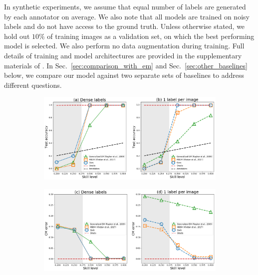 In synthetic experiments, we assume that equal number of labels are generated by each annotator on average. We also note that all models are trained on noisy labels and do not have access to the ground truth. Unless otherwise stated, we hold out $10\%$ of training images as a validation set, on which the best performing model is selected. We also perform no data augmentation during training. Full details of training and model architectures are provided in the supplementary materials of \cite{tanno2019learning}. In Sec.~\ref{sec:comparison_with_em} and Sec.~\ref{sec:other_baselines} below, we compare our model against two separate sets of baselines to address different questions. 

\begin{figure}[ht]
	\center
	\begin{subfigure}[]{0.49\linewidth}
		\includegraphics[width=\linewidth]{chapter_4/figures/figures_new/figure_3_ab.png}
	\end{subfigure}
	\begin{subfigure}[]{0.49\linewidth}
		\includegraphics[width=\linewidth]{chapter_4/figures/figures_new/figure_3_cd.png}
	\end{subfigure}


\end{figure}
